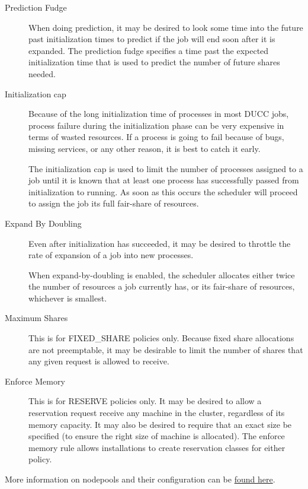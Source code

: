 \begin{description}
        \item[Prediction Fudge] When doing prediction, it may be desired to look some time into the
          future past initialization times to predict if the job will end soon after it is expanded. The
          prediction fudge specifies a time past the expected initialization time that is used to
          predict the number of future shares needed.

        \item[Initialization cap] Because of the long initialization time of processes in most DUCC jobs,
          process failure during the initialization phase can be very expensive in terms of wasted
          resources. If a process is going to fail because of bugs, missing services, or any other
          reason, it is best to catch it early.

          The initialization cap is used to limit the number of processes assigned to a job until it is 
          known that at least one process has successfully passed from initialization to running. As soon 
          as this occurs the scheduler will proceed to assign the job its full fair-share of resources. 

        \item[Expand By Doubling] Even after initialization has succeeded, it may be desired to throttle
          the rate of expansion of a job into new processes.

          When expand-by-doubling is enabled, the scheduler allocates either twice the number of 
          resources a job currently has, or its fair-share of resources, whichever is smallest. 

        \item[Maximum Shares] This is for FIXED\_SHARE policies only. Because fixed share allocations are
          not preemptable, it may be desirable to limit the number of shares that any given request is
          allowed to receive.

        \item[Enforce Memory] This is for RESERVE policies only. It may be desired to allow a
          reservation request receive any machine in the cluster, regardless of its memory capacity. It
          may also be desired to require that an exact size be specified (to ensure the right size of
          machine is allocated). The enforce memory rule allows installations to create reservation
          classes for either policy.
    \end{description}
        
    More information on nodepools and their configuration can be \hyperref[subsubsec:class.configuration]{found here}.
